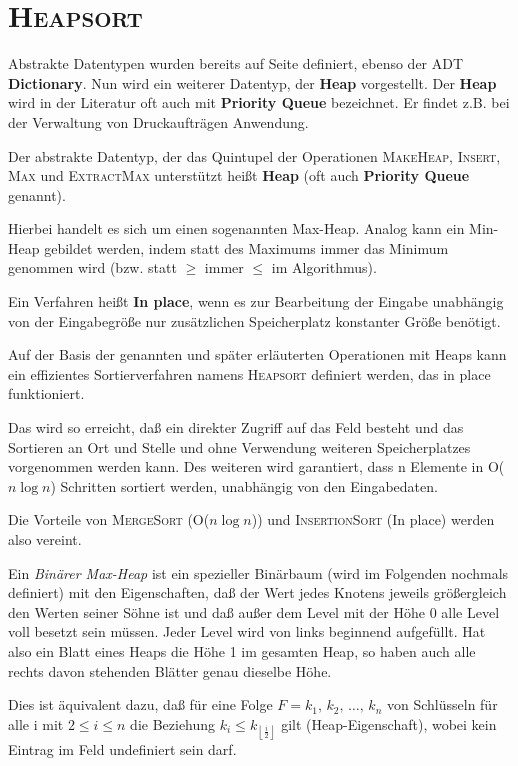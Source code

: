 \section{\textsc{Heapsort}}
Abstrakte Datentypen wurden bereits auf Seite \pageref{ADT} definiert, ebenso der ADT \textbf{Dictionary}. Nun wird ein weiterer
Datentyp, der \textbf{Heap} vorgestellt. Der \textbf{Heap} wird in der Literatur oft auch mit \textbf{Priority Queue} bezeichnet.
Er findet z.B. bei der Verwaltung von Druckaufträgen Anwendung.

\begin{definition}[Heap]
Der abstrakte Datentyp, der das Quintupel der Operationen
\textsc{MakeHeap}, \textsc{Insert}, \textsc{Max} und \textsc{ExtractMax} unterstützt heißt \textbf{Heap} (oft auch \textbf{Priority Queue} genannt).
 \end{definition}

Hierbei handelt es sich um einen sogenannten Max-Heap. Analog kann ein Min-Heap gebildet werden, indem statt des Maximums immer das
Minimum genommen wird (bzw. statt $\geq$ immer $\leq$ im Algorithmus). 
% 
%
\begin{definition}[In place]
Ein Verfahren heißt \textbf{In place}, wenn es zur Bearbeitung der Eingabe unabhängig von der Eingabegröße nur zusätzlichen
Speicherplatz konstanter Größe benötigt.
\end{definition}

Auf der Basis der genannten und später erläuterten Operationen mit Heaps kann ein effizientes Sortierverfahren namens
\textsc{Heapsort} definiert werden, das in place funktioniert.

Das wird so erreicht, daß ein direkter Zugriff auf das Feld besteht und das Sortieren an Ort und Stelle und ohne Verwendung weiteren
Speicherplatzes vorgenommen werden kann. Des weiteren wird garantiert, dass n Elemente in O($n \log n$) Schritten sortiert werden,
unabhängig von den Eingabedaten.

Die Vorteile von \textsc{MergeSort} (O($n \log n$)) und \textsc{InsertionSort} (In place) werden also vereint.

\begin{definition}
Ein \textit{Binärer Max-Heap} ist ein spezieller Binärbaum (wird im Folgenden nochmals definiert) mit den Eigenschaften, daß der
Wert jedes Knotens jeweils größergleich den Werten seiner Söhne ist und daß außer dem Level mit der Höhe 0 alle Level voll besetzt
sein müssen. Jeder Level wird von links beginnend aufgefüllt. Hat also ein Blatt eines Heaps die Höhe 1 im gesamten Heap, so haben
auch alle rechts davon stehenden Blätter genau dieselbe Höhe.

Dies ist äquivalent dazu, daß für eine Folge $F=k_{1},\,k_{2},\,\ldots,\,k_{n}$ von Schlüsseln 
für alle i mit $2\leq i\leq n$ die Beziehung $k_{i}\leq k_{\left\lfloor \frac{i}{2}\right\rfloor}$ gilt (Heap-Eigenschaft), wobei kein
Eintrag im Feld undefiniert sein darf.
\end{definition}

